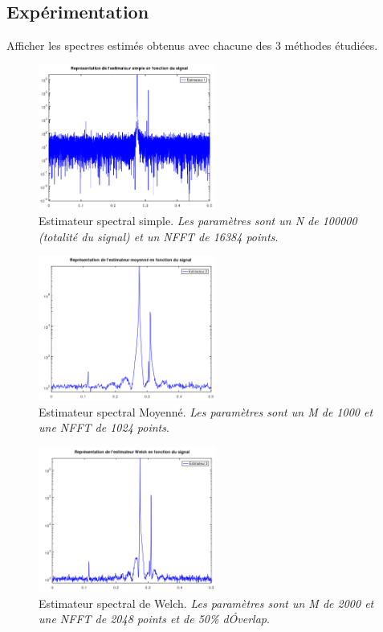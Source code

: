 \documentclass{article}
\begin{document}
\subsection{Expérimentation}

Afficher les spectres estimés obtenus avec chacune des 3 méthodes étudiées.


\begin{figure}[h]
\centerline{\includegraphics[width=0.52\textwidth]{images/casESSimpleSignalInconnue.png}}
\caption{Estimateur spectral simple. \textit{Les paramètres sont un N de 100000 (totalité du signal) et un NFFT de 16384 points}.}
\end{figure}

\begin{figure}[h]
\centerline{\includegraphics[width=0.52\textwidth]{images/casESMSignalInconnue.png}}
\caption{Estimateur spectral Moyenné. \textit{Les paramètres sont un M de 1000 et une NFFT de 1024 points}.}
\end{figure}

\begin{figure}[h]
\centerline{\includegraphics[width=0.52\textwidth]{images/casESWSignalInconnue.png}}
\caption{Estimateur spectral de Welch. \textit{Les paramètres sont un M de 2000 et une NFFT de 2048 points et de 50\% d\'Overlap}.}
\end{figure}
\end{document}
